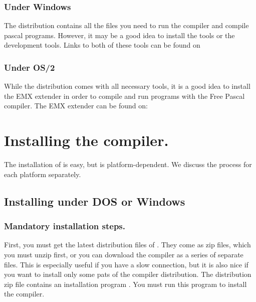 \documentclass{report}
\begin{document}
\subsubsection{Under Windows}
The \windows distribution contains all the files you need to run the compiler
and compile pascal programs. However, it may be a good idea to install
the  tools or the  development tools. Links
to both of these tools can be found on 

\subsubsection{Under OS/2}
While the \fpc distribution comes with all necessary tools, it is a good
idea to install the EMX extender in order to compile and run
programs with the Free Pascal compiler. The EMX extender can be found on:\\

\section{Installing the compiler.}
The installation of \fpc is easy, but is platform-dependent.
We discuss the process for each platform separately.

\subsection{Installing under DOS or Windows}
\subsubsection{Mandatory installation steps.}
First, you must get the latest distribution files of \fpc. They come as zip
files, which you must unzip first, or you can download the compiler as a
series of separate files. This is especially useful if you have a slow
connection, but it is also nice if you want to install only some pats of the
compiler distribution.  The distribution zip file contains an
installation program . You must run this program to install
the compiler.
\end{document}
